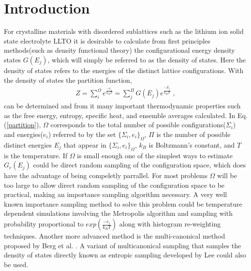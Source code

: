 \documentclass[aps,pre,reprint,superscriptaddress,showkeys]{revtex4-1}
\begin{document}
\section{Introduction}
For crystalline  materials  with disordered sublattices such as the lithium ion solid state electrolyte LLTO it is desirable to calculate from first principles methods(such as density functional theory\cite{kohn:1965}) the configurational energy density states $G(E_j)$, which will simply be referred to as the density of states. Here the  density of states refers to the energies of the distinct lattice configurations. With the  density of states the partition function,
\begin{equation}
\begin{split}
Z = \sum_{i}^{\Omega}e^{\frac{-e_i}{k_B T} }= \sum_{j}^{\Pi}G(E_j)e^{\frac{-E_j}{k_BT}} \;,
\end{split}
\label{partition}
\end{equation}
can be  determined and from it many important thermodynamic properties such as the free energy, entropy, specific heat, and ensemble averages calculated. In Eq. (\ref{partition}), $\Omega$ corresponds to the total number of possible  configurations($\Sigma_i$) and energies($e_i$) referred to by the set $\{\Sigma_i,e_i\}_\Omega$, $\Pi$ is the number of possible distinct energies $E_j$ that appear in $\{\Sigma_i,e_i\}_\Omega$, $k_B$ is Boltzmann's constant, and $T$ is the temperature. If $\Omega$ is small enough one of the simplest ways to estimate $G_r(E_j)$ could be direct random sampling of the configuration space\cite{partition}, which does have the advantage of being compeletly parrallel. For most problems $\Omega$ will be too large to allow direct random sampling of the configuration space to be practical, making an importance sampling algorithm necessary. A very well known importance sampling method to solve this problem could be temperature dependent simulations involving the Metropolis algorithm and sampling with probability proportional  to $exp(\frac{-e_i}{k_B T})$ 
along with histogram re-weighting techniques\cite{metropolis_equation_1953,histogram_reweighting, landau_MC_simulations}. Another more advanced method is the multi-canonical method proposed by Berg et al. \cite{Multi_Canonical,multi_canonical_two}. A variant of multicanonical sampling that samples the density of states directly known as entropic sampling developed by Lee \cite{Entropic_Sampling} could also be used. 
\end{document}
